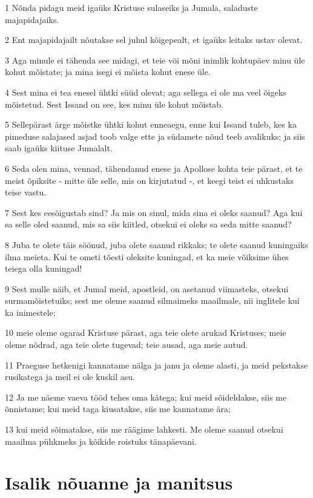 \par 1 Nõnda pidagu meid igaüks Kristuse sulaseiks ja Jumala, saladuste majapidajaiks.
\par 2 Ent majapidajailt nõutakse sel juhul kõigepealt, et igaüks leitaks ustav olevat.
\par 3 Aga minule ei tähenda see midagi, et teie või mõni inimlik kohtupäev minu üle kohut mõistate; ja mina isegi ei mõista kohut enese üle.
\par 4 Sest mina ei tea enesel ühtki süüd olevat; aga sellega ei ole ma veel õigeks mõistetud. Sest Issand on see, kes minu üle kohut mõistab.
\par 5 Sellepärast ärge mõistke ühtki kohut enneaegu, enne kui Issand tuleb, kes ka pimeduse salajased asjad toob valge ette ja südamete nõud teeb avalikuks; ja siis saab igaüks kiituse Jumalalt.
\par 6 Seda olen mina, vennad, tähendanud enese ja Apollose kohta teie pärast, et te meist õpiksite - mitte üle selle, mis on kirjutatud -, et keegi teist ei uhkustaks teise vastu.
\par 7 Sest kes eesõigustab sind? Ja mis on sinul, mida sina ei oleks saanud? Aga kui sa selle oled saanud, mis sa siis kiitled, otsekui ei oleks sa seda mitte saanud?
\par 8 Juba te olete täis söönud, juba olete saanud rikkaks; te olete saanud kuningaiks ilma meieta. Kui te ometi tõesti oleksite kuningad, et ka meie võiksime ühes teiega olla kuningad!
\par 9 Sest mulle näib, et Jumal meid, apostleid, on asetanud viimasteks, otsekui surmamõistetuiks; sest me oleme saanud silmaimeks maailmale, nii inglitele kui ka inimestele;
\par 10 meie oleme ogarad Kristuse pärast, aga teie olete arukad Kristuses; meie oleme nõdrad, aga teie olete tugevad; teie ausad, aga meie autud.
\par 11 Praeguse hetkenigi kannatame nälga ja janu ja oleme alasti, ja meid pekstakse rusikatega ja meil ei ole kuskil asu.
\par 12 Ja me näeme vaeva tööd tehes oma kätega; kui meid sõideldakse, siis me õnnistame; kui meid taga kiusatakse, siis me kannatame ära;
\par 13 kui meid sõimatakse, siis me räägime lahkesti. Me oleme saanud otsekui maailma pühkmeks ja kõikide roistuks tänapäevani.

\section*{Isalik nõuanne ja manitsus}

